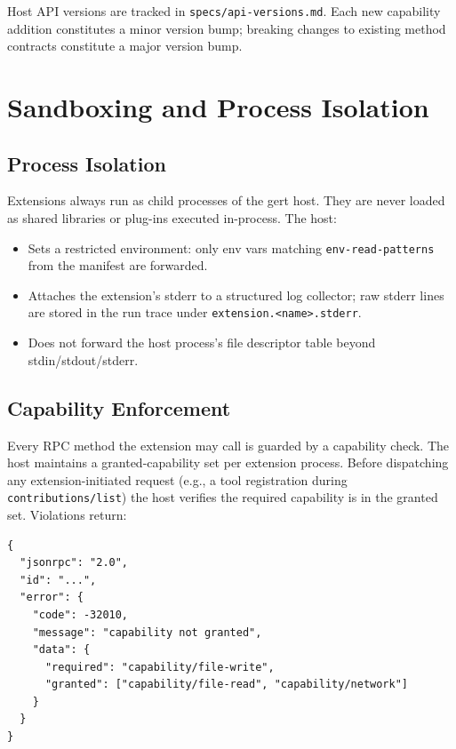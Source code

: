 Host API versions are tracked in \texttt{specs/api-versions.md}.  Each new
capability addition constitutes a minor version bump; breaking changes to
existing method contracts constitute a major version bump.

\section{Sandboxing and Process Isolation}
\label{sec:ext-sandbox}

\subsection{Process Isolation}

Extensions always run as child processes of the gert host.  They are never
loaded as shared libraries or plug-ins executed in-process.  The host:

\begin{itemize}
  \item Sets a restricted environment: only env vars matching
        \texttt{env-read-patterns} from the manifest are forwarded.
  \item Attaches the extension's stderr to a structured log collector; raw
        stderr lines are stored in the run trace under
        \texttt{extension.<name>.stderr}.
  \item Does not forward the host process's file descriptor table beyond
        stdin/stdout/stderr.
\end{itemize}

\subsection{Capability Enforcement}

Every RPC method the extension may call is guarded by a capability check.  The
host maintains a granted-capability set per extension process.  Before
dispatching any extension-initiated request (e.g., a tool registration during
\texttt{contributions/list}) the host verifies the required capability is in
the granted set.  Violations return:

\begin{verbatim}
{
  "jsonrpc": "2.0",
  "id": "...",
  "error": {
    "code": -32010,
    "message": "capability not granted",
    "data": {
      "required": "capability/file-write",
      "granted": ["capability/file-read", "capability/network"]
    }
  }
}
\end{verbatim}

